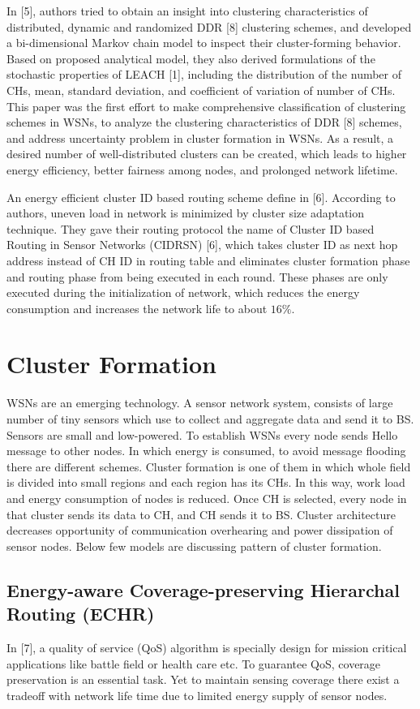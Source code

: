 \documentclass[10pt, conference, compsocconf]{IEEEtran}
\begin{document}
In [5], authors tried to obtain an insight into clustering characteristics of distributed, dynamic and randomized DDR [8] clustering schemes, and developed a bi-dimensional Markov chain model to inspect their cluster-forming behavior. Based on proposed analytical model, they also derived formulations of the stochastic properties of LEACH [1], including the distribution of the number of CHs, mean,  standard deviation, and coefficient of variation of number of CHs. This paper was the first effort to make comprehensive classification of clustering schemes in WSNs, to analyze the clustering characteristics of DDR [8] schemes, and address uncertainty problem in cluster formation in WSNs. As a result, a desired number of well-distributed clusters can be created, which leads to higher energy efficiency, better fairness among nodes, and prolonged network lifetime.

An energy efficient cluster ID based routing scheme define in [6]. According to authors, uneven load in network is minimized by cluster size adaptation technique. They gave their routing protocol the name of Cluster ID based Routing in Sensor Networks (CIDRSN) [6], which takes cluster ID as next hop address instead of CH ID in routing table and eliminates cluster formation phase and routing phase from being executed in each round. These phases are only executed during the initialization of network, which reduces the energy consumption and increases the network life to about $16 \%$.

\section{Cluster Formation}
WSNs are an emerging technology. A sensor network system, consists of large number of tiny sensors which use to collect and aggregate data and send it to BS. Sensors are small and low-powered. To establish  WSNs every node sends Hello message to other nodes. In which energy is consumed, to avoid message flooding there are different schemes. Cluster formation is one of them in which whole field is divided into small regions and each region has its CHs. In this way,  work load and energy consumption of nodes is reduced. Once CH is selected, every node in that cluster sends its data to CH, and CH sends it to BS. Cluster architecture decreases opportunity of communication overhearing and power dissipation of sensor nodes. Below few models are discussing pattern of cluster formation.

\subsection{Energy-aware Coverage-preserving Hierarchal Routing (ECHR)}
In [7], a quality of service (QoS) algorithm is specially design for mission critical applications like battle field or health care etc. To guarantee QoS, coverage preservation is an essential task. Yet to maintain sensing coverage there exist a tradeoff with network life time due to limited energy supply of sensor nodes.
\end{document}
